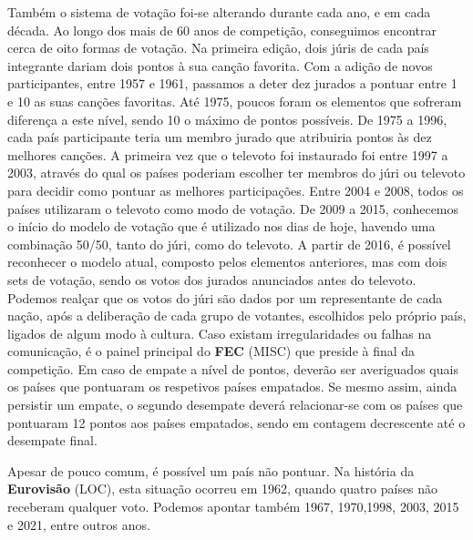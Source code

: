 \documentclass[12pt,a4paper]{article}
\begin{document}
Também  o  sistema  de  votação  foi-se  alterando  durante  cada  ano,  e  em  cada década. Ao longo dos mais de 60 anos de competição, conseguimos encontrar cerca de oito formas de votação. Na primeira edição, dois júris de cada país integrante dariam dois pontos à sua canção favorita. Com a adição de novos participantes, entre 1957 e 1961, passamos a deter dez jurados a pontuar entre 1 e 10 as suas canções favoritas. Até 1975, poucos foram os elementos que sofreram diferença a este nível, sendo 10 o máximo de pontos possíveis.  De 1975 a 1996, cada país  participante teria um  membro jurado que atribuiria pontos às dez melhores canções. A primeira vez que o televoto foi instaurado foi entre 1997 a 2003, através do qual os países poderiam escolher ter membros do júri ou  televoto  para  decidir  como  pontuar  as  melhores  participações.  Entre  2004  e  2008, todos  os  países  utilizaram  o  televoto  como  modo  de  votação.  De  2009  a  2015, conhecemos o início do modelo de votação que é utilizado nos dias de hoje, havendo uma combinação  50/50,  tanto  do  júri,  como  do  televoto.  A  partir  de  2016,  é  possível reconhecer o modelo atual, composto pelos elementos anteriores, mas com dois sets de votação, sendo os votos dos jurados anunciados antes do televoto. Podemos realçar que os votos do júri são dados por um representante de cada nação, após a deliberação de cada grupo de votantes, escolhidos pelo próprio país, ligados de algum modo à cultura. Caso existam  irregularidades  ou  falhas  na  comunicação,  é  o  painel  principal  do  \textbf{FEC} (MISC)  que preside  à  final  da  competição.  Em  caso  de  empate  a  nível  de  pontos,  deverão  ser averiguados quais os países que pontuaram os respetivos países empatados. Se mesmo assim,  ainda  persistir  um  empate,  o  segundo  desempate  deverá  relacionar-se  com  os países que pontuaram 12 pontos aos países empatados, sendo em contagem decrescente até o desempate final.

Apesar  de  pouco  comum,  é  possível  um  país  não  pontuar.  Na  história  da \textbf{Eurovisão} (LOC), esta situação ocorreu em 1962, quando quatro países não receberam qualquer voto. Podemos apontar também 1967, 1970,1998, 2003, 2015 e 2021, entre outros anos.
\end{document}
